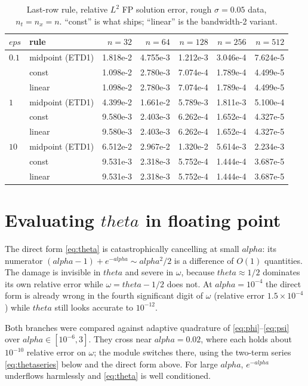 \documentclass[11pt]{article}
\newcommand{\eps}{\varepsilon}
\newcommand{\dt}{\Delta t}
\newcommand{\dx}{\Delta x}
\newcommand{\code}[1]{\texttt{#1}}
\def\theta{theta}\def\Theta{Theta}\def\alpha{alpha}\def\rho{rho}%
\def\eps{eps}\def\dt{dt}\def\dx{dx}\def\code#1{#1}%
\begin{document}
\begin{table}[htbp]
\centering
\caption{Last-row rule, relative $L^2$ FP solution error, rough $\sigma=0.05$ data,
$n_t=n_x=n$. ``const'' is what ships; ``linear'' is the bandwidth-2 variant.}
\label{tab:lastrow}
\begin{tabular}{@{}llrrrrr@{}}
\toprule
$\eps$ & rule & $n{=}32$ & $n{=}64$ & $n{=}128$ & $n{=}256$ & $n{=}512$ \\
\midrule
$0.1$ & midpoint (ETD1) & 1.818e-2 & 4.755e-3 & 1.212e-3 & 3.046e-4 & 7.624e-5 \\
      & const           & 1.098e-2 & 2.780e-3 & 7.074e-4 & 1.789e-4 & 4.499e-5 \\
      & linear          & 1.098e-2 & 2.780e-3 & 7.074e-4 & 1.789e-4 & 4.499e-5 \\
\midrule
$1$   & midpoint (ETD1) & 4.399e-2 & 1.661e-2 & 5.789e-3 & 1.811e-3 & 5.100e-4 \\
      & const           & 9.580e-3 & 2.403e-3 & 6.262e-4 & 1.652e-4 & 4.327e-5 \\
      & linear          & 9.580e-3 & 2.403e-3 & 6.262e-4 & 1.652e-4 & 4.327e-5 \\
\midrule
$10$  & midpoint (ETD1) & 6.512e-2 & 2.967e-2 & 1.320e-2 & 5.614e-3 & 2.234e-3 \\
      & const           & 9.531e-3 & 2.318e-3 & 5.752e-4 & 1.444e-4 & 3.687e-5 \\
      & linear          & 9.531e-3 & 2.318e-3 & 5.752e-4 & 1.444e-4 & 3.687e-5 \\
\bottomrule
\end{tabular}
\end{table}

\section{Evaluating $\theta$ in floating point}

The direct form \eqref{eq:theta} is catastrophically cancelling at small $\alpha$: its
numerator $(\alpha-1)+e^{-\alpha}\sim\alpha^2/2$ is a difference of $O(1)$ quantities.
The damage is invisible in $\theta$ and severe in $\omega$, because $\theta\approx1/2$
dominates its own relative error while $\omega=\theta-1/2$ does not. At $\alpha=10^{-4}$
the direct form is already wrong in the fourth significant digit of $\omega$ (relative
error $1.5\times10^{-4}$) while $\theta$ still looks accurate to $10^{-12}$.

Both branches were compared against adaptive quadrature of
\eqref{eq:phi}--\eqref{eq:psi} over $\alpha\in[10^{-6},3]$. They cross near
$\alpha=0.02$, where each holds about $10^{-10}$ relative error on $\omega$; the module
switches there, using the two-term series \eqref{eq:thetaseries} below and the direct
form above. For large $\alpha$, $e^{-\alpha}$ underflows harmlessly and \eqref{eq:theta}
is well conditioned.
\end{document}
